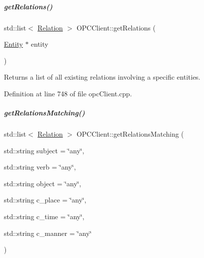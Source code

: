 \mbox{\label{group__icubclient__clients_a7a5d4c886b537244cf7fbd25d4141388}} 
\subparagraph{\texorpdfstring{get\+Relations()}{getRelations()}\hspace{0.1cm}{\footnotesize\ttfamily [3/3]}}
{\footnotesize\ttfamily std\+::list$<$ \hyperlink{group__icubclient__representations_classicubclient_1_1Relation}{Relation} $>$ O\+P\+C\+Client\+::get\+Relations (\begin{DoxyParamCaption}\item[{\hyperlink{group__icubclient__representations_classicubclient_1_1Entity}{Entity} $\ast$}]{entity }\end{DoxyParamCaption})}



Returns a list of all existing relations involving a specific entities. 



Definition at line 748 of file opc\+Client.\+cpp.

\mbox{\label{group__icubclient__clients_a6df65f36cc97fe26d05df85c3c56faed}} 
\subparagraph{\texorpdfstring{get\+Relations\+Matching()}{getRelationsMatching()}}
{\footnotesize\ttfamily std\+::list$<$ \hyperlink{group__icubclient__representations_classicubclient_1_1Relation}{Relation} $>$ O\+P\+C\+Client\+::get\+Relations\+Matching (\begin{DoxyParamCaption}\item[{std\+::string}]{subject = {\ttfamily \char`\"{}any\char`\"{}},  }\item[{std\+::string}]{verb = {\ttfamily \char`\"{}any\char`\"{}},  }\item[{std\+::string}]{object = {\ttfamily \char`\"{}any\char`\"{}},  }\item[{std\+::string}]{c\+\_\+place = {\ttfamily \char`\"{}any\char`\"{}},  }\item[{std\+::string}]{c\+\_\+time = {\ttfamily \char`\"{}any\char`\"{}},  }\item[{std\+::string}]{c\+\_\+manner = {\ttfamily \char`\"{}any\char`\"{}} }\end{DoxyParamCaption})}



